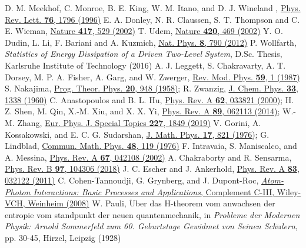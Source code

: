 \documentclass[aps,pra,twocolumn,showpacs,preprintnumbers,amsmath,amssymb,footinbib]{revtex4}
\def\nat#1#2#3{Nature {\bf #1}, #2 (#3)}
\def\np#1#2#3{Nat. Phys. {\bf #1}, #2 (#3)}
\def\rmp#1#2#3{Rev. Mod. Phys. {\bf #1}, #2 (#3)}
\def\prl#1#2#3{Phys. Rev. Lett. {\bf #1}, #2 (#3)}
\def\pra#1#2#3{Phys. Rev. A {\bf #1}, #2 (#3)}
\def\prb#1#2#3{Phys. Rev. B {\bf #1}, #2 (#3)}
\begin{document}
\begin{thebibliography}{99}
D. M. Meekhof, C. Monroe, B. E. King, W. M. Itano, and D. J. Wineland ,  \href{http://dx.doi.org/10.1103/PhysRevLett.76.1796}{\prl{76}{1796}{1996}}
E. A. Donley, N. R. Claussen, S. T. Thompson and C. E. Wieman, \href{http://dx.doi.org/10.1038/417529a}{\nat{417}{529}{2002}}
T. Udem,  \href{http://dx.doi.org/10.1038/420469a}{\nat{420}{469}{2002}}
Y. O. Dudin, L. Li, F. Bariani and A. Kuzmich,  \href{http://dx.doi.org/10.1038/NPHYS2413}{\np{8}{790}{2012}}
P. Wollfarth, \textit{Statistics of Energy Dissipation of a Driven Two-Level System}, D.Sc. Thesis, Karlsruhe Institute of Technology (2016)
A. J. Leggett, S. Chakravarty, A. T. Dorsey, M. P. A. Fisher, A. Garg, and W. Zwerger, \href{http://dx.doi.org/10.1103/RevModPhys.59.1}{\rmp{59}{1}{1987}}
S. Nakajima, \href{https://doi.org/10.1143/PTP.20.948}{Prog. Theor. Phys. \textbf{20}, 948 (1958)}; R. Zwanzig, \href{https://doi.org/10.1063/1.1731409}{J. Chem. Phys. \textbf{33}, 1338 (1960)}
C. Anastopoulos and B. L. Hu, \href{https://doi.org/10.1103/PhysRevA.62.033821}{\pra{62}{033821}{2000}}; H. Z. Shen, M. Qin, X.-M. Xiu, and X. X. Yi, \href{https://doi.org/10.1103/PhysRevA.89.062113} {\pra{89}{062113}{2014}}; W.-M. Zhang, \href{https://doi.org/10.1140/epjst/e2018-800047-4
}{Eur. Phys. J. Special Topics \textbf{227}, 1849 (2019)}
V. Gorini, A. Kossakowski, and E. C. G. Sudarshan, \href{https://doi.org/10.1063/1.522979}{J. Math. Phys. \textbf{17}, 821 (1976)}; G. Lindblad, \href{https://projecteuclid.org/euclid.cmp/1103899849}{Commun. Math. Phys. \textbf{48}, 119 (1976)}
F. Intravaia, S. Maniscalco, and A. Messina, \href{https://doi.org/10.1103/PhysRevA.67.042108}{\pra{67}{042108}{2002}}
A. Chakraborty and R. Sensarma, \href{https://doi.org/10.1103/PhysRevB.97.104306}{\prb{97}{104306}{2018}}
J. C. Escher and J. Ankerhold, \href{https://doi.org/10.1103/PhysRevA.83.032122}{\pra{83}{032122}{2011}}
C. Cohen-Tannoudji, G. Grynberg, and J. Dupont-Roc, \href{https://onlinelibrary.wiley.com/doi/book/10.1002/9783527617197}{\textit{Atom-Photon Interactions: Basic Processes and Applications}, Complement C-III, Wiley-VCH, Weinheim (2008)}
W. Pauli, $\ddot{\text{U}}$ber das H-theorem vom anwachsen der entropie vom standpunkt der neuen quantenmechanik, in \textit{Probleme der Modernen Physik: Arnold Sommerfeld zum 60. Geburtstage Gewidmet von Seinen Sch$\ddot{\text{u}}$lern}, pp. 30-45, Hirzel, Leipzig (1928)

\end{thebibliography}
\end{document}
